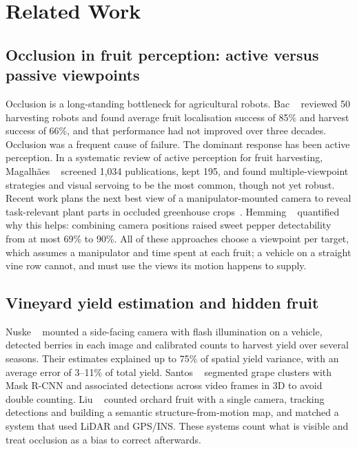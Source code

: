\section{Related Work}
\subsection{Occlusion in fruit perception: active versus passive viewpoints}
Occlusion is a long-standing bottleneck for agricultural robots. Bac \etal~\cite{bac2014} reviewed 50 harvesting robots and found average fruit localisation success of 85\% and harvest success of 66\%, and that performance had not improved over three decades. Occlusion was a frequent cause of failure. The dominant response has been active perception. In a systematic review of active perception for fruit harvesting, Magalhães \etal~\cite{magalhaes2022} screened 1,034 publications, kept 195, and found multiple-viewpoint strategies and visual servoing to be the most common, though not yet robust. Recent work plans the next best view of a manipulator-mounted camera to reveal task-relevant plant parts in occluded greenhouse crops~\cite{burusa2024}. Hemming \etal~\cite{hemming2014} quantified why this helps: combining camera positions raised sweet pepper detectability from at most 69\% to 90\%. All of these approaches choose a viewpoint per target, which assumes a manipulator and time spent at each fruit; a vehicle on a straight vine row cannot, and must use the views its motion happens to supply.

\subsection{Vineyard yield estimation and hidden fruit}
Nuske \etal~\cite{nuske2014} mounted a side-facing camera with flash illumination on a vehicle, detected berries in each image and calibrated counts to harvest yield over several seasons. Their estimates explained up to 75\% of spatial yield variance, with an average error of 3--11\% of total yield. Santos \etal~\cite{santos2020} segmented grape clusters with Mask R-CNN and associated detections across video frames in 3D to avoid double counting. Liu \etal~\cite{liu2019} counted orchard fruit with a single camera, tracking detections and building a semantic structure-from-motion map, and matched a system that used LiDAR and GPS/INS. These systems count what is visible and treat occlusion as a bias to correct afterwards.

